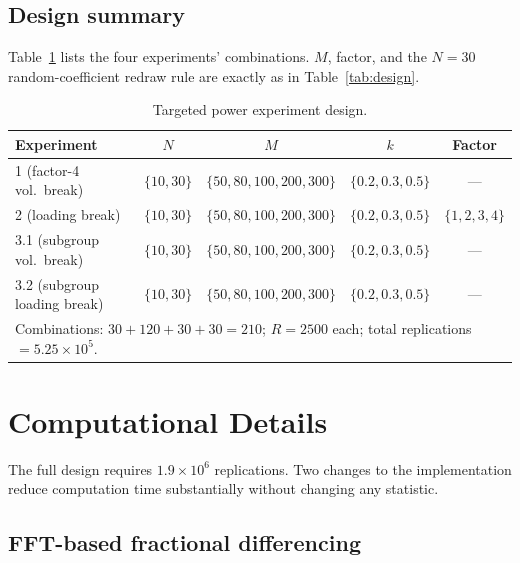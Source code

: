 \documentclass[12pt]{article}
\begin{document}
\subsection{Design summary}

Table~\ref{tab:targeteddesign} lists the four experiments' combinations.
$M$, factor, and the $N=30$ random-coefficient redraw rule are exactly as
in Table~\ref{tab:design}.

\begin{table}[h]
\centering
\caption{Targeted power experiment design.}
\label{tab:targeteddesign}
\begin{tabular}{lcccc}
\toprule
Experiment & $N$ & $M$ & $k$ & Factor \\
\midrule
1 (factor-4 vol.\ break)        & $\{10,30\}$ & $\{50,80,100,200,300\}$ & $\{0.2,0.3,0.5\}$ & --- \\
2 (loading break)               & $\{10,30\}$ & $\{50,80,100,200,300\}$ & $\{0.2,0.3,0.5\}$ & $\{1,2,3,4\}$ \\
3.1 (subgroup vol.\ break)      & $\{10,30\}$ & $\{50,80,100,200,300\}$ & $\{0.2,0.3,0.5\}$ & --- \\
3.2 (subgroup loading break)    & $\{10,30\}$ & $\{50,80,100,200,300\}$ & $\{0.2,0.3,0.5\}$ & --- \\
\midrule
\multicolumn{5}{l}{Combinations: $30+120+30+30=210$; $R=2500$ each; total replications $=5.25\times10^5$.} \\
\bottomrule
\end{tabular}
\end{table}

\section{Computational Details}
\label{sec:computation}

The full design requires $1.9\times10^6$ replications. Two changes to the
implementation reduce computation time substantially without changing any
statistic.

\subsection{FFT-based fractional differencing}
\label{subsec:fftfrac}
\end{document}
